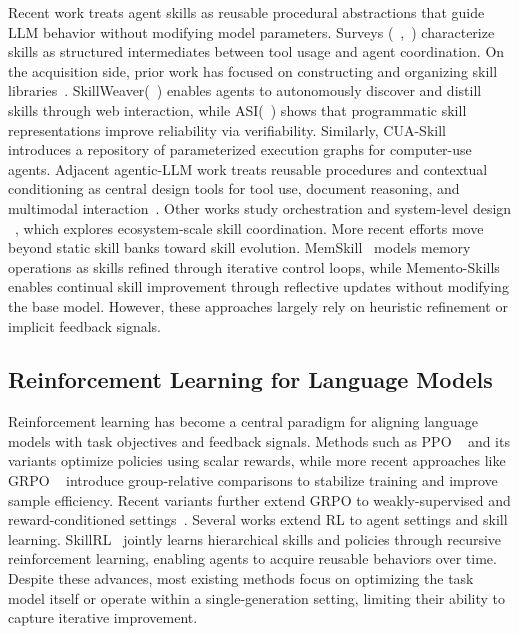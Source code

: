 Recent work treats agent skills as reusable procedural abstractions that guide LLM behavior without modifying model parameters. Surveys (~\citep{xu2026agent},~\citep{jiang2026sok}) characterize skills as structured intermediates between tool usage and agent coordination. On the acquisition side, prior work has focused on constructing and organizing skill libraries~\citep{nguyen2025guisurvey, huang2025surveyfoundation}. SkillWeaver(~\citep{zheng2025skillweaver}) enables agents to autonomously discover and distill skills through web interaction, while ASI(~\citep{wang2025inducing}) shows that programmatic skill representations improve reliability via verifiability. Similarly, CUA-Skill~\citep{chen2026cua} introduces a repository of parameterized execution graphs for computer-use agents. Adjacent agentic-LLM work treats reusable procedures and contextual conditioning as central design tools for tool use, document reasoning, and multimodal interaction~\citep{xia2025sand, wu2025docreact,wu2025ctrls,wang2025dice,huang2025towardsagentic}. Other works study orchestration and system-level design ~\citep{li2026organizing}, which explores ecosystem-scale skill coordination. More recent efforts move beyond static skill banks toward skill evolution. MemSkill~\citep{zhang2026memskill} models memory operations as skills refined through iterative control loops, while Memento-Skills~\citep{zhou2025memento} enables continual skill improvement through reflective updates without modifying the base model. However, these approaches largely rely on heuristic refinement or implicit feedback signals.

\subsection{Reinforcement Learning for Language Models}

Reinforcement learning has become a central paradigm for aligning language models with task objectives and feedback signals. Methods such as PPO ~\citep{schulman2017proximal} and its variants optimize policies using scalar rewards, while more recent approaches like GRPO ~\citep{shao2024deepseekmath} introduce group-relative comparisons to stabilize training and improve sample efficiency. Recent variants further extend GRPO to weakly-supervised and reward-conditioned settings~\citep{mundada2026wsgrpo,zhong2026rc}. Several works extend RL to agent settings and skill learning. SkillRL~\citep{xia2026skillrl} jointly learns hierarchical skills and policies through recursive reinforcement learning, enabling agents to acquire reusable behaviors over time. Despite these advances, most existing methods focus on optimizing the task model itself or operate within a single-generation setting, limiting their ability to capture iterative improvement.


